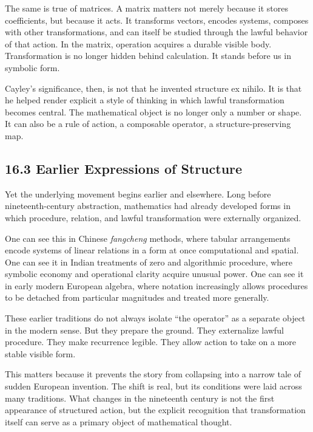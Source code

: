 \documentclass[
]{article}
\begin{document}
The same is true of matrices. A matrix matters not merely because it
stores coefficients, but because it acts. It transforms vectors, encodes
systems, composes with other transformations, and can itself be studied
through the lawful behavior of that action. In the matrix, operation
acquires a durable visible body. Transformation is no longer hidden
behind calculation. It stands before us in symbolic form.

Cayley's significance, then, is not that he invented structure ex
nihilo. It is that he helped render explicit a style of thinking in
which lawful transformation becomes central. The mathematical object is
no longer only a number or shape. It can also be a rule of action, a
composable operator, a structure-preserving map.

\hypertarget{earlier-expressions-of-structure}{%
\subsection{16.3 Earlier Expressions of
Structure}\label{earlier-expressions-of-structure}}

Yet the underlying movement begins earlier and elsewhere. Long before
nineteenth-century abstraction, mathematics had already developed forms
in which procedure, relation, and lawful transformation were externally
organized.

One can see this in Chinese \emph{fangcheng} methods, where tabular
arrangements encode systems of linear relations in a form at once
computational and spatial. One can see it in Indian treatments of zero
and algorithmic procedure, where symbolic economy and operational
clarity acquire unusual power. One can see it in early modern European
algebra, where notation increasingly allows procedures to be detached
from particular magnitudes and treated more generally.

These earlier traditions do not always isolate ``the operator'' as a
separate object in the modern sense. But they prepare the ground. They
externalize lawful procedure. They make recurrence legible. They allow
action to take on a more stable visible form.

This matters because it prevents the story from collapsing into a narrow
tale of sudden European invention. The shift is real, but its conditions
were laid across many traditions. What changes in the nineteenth century
is not the first appearance of structured action, but the explicit
recognition that transformation itself can serve as a primary object of
mathematical thought.
\end{document}
